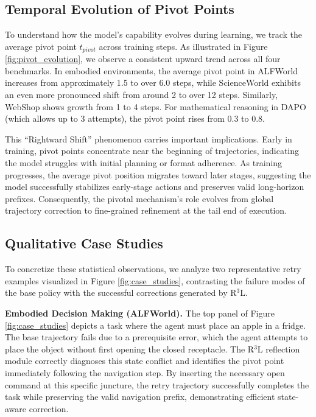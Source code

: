 \documentclass[11pt]{article}
\begin{document}
\subsection{Temporal Evolution of Pivot Points}

To understand how the model's capability evolves during learning, we track the average pivot point $t_{pivot}$ across training steps. As illustrated in Figure \ref{fig:pivot_evolution}, we observe a consistent upward trend across all four benchmarks. In embodied environments, the average pivot point in ALFWorld increases from approximately 1.5 to over 6.0 steps, while ScienceWorld exhibits an even more pronounced shift from around 2 to over 12 steps. Similarly, WebShop shows growth from 1 to 4 steps. For mathematical reasoning in DAPO (which allows up to 3 attempts), the pivot point rises from 0.3 to 0.8.

This ``Rightward Shift'' phenomenon carries important implications. Early in training, pivot points concentrate near the beginning of trajectories, indicating the model struggles with initial planning or format adherence. As training progresses, the average pivot position migrates toward later stages, suggesting the model successfully stabilizes early-stage actions and preserves valid long-horizon prefixes. Consequently, the pivotal mechanism's role evolves from global trajectory correction to fine-grained refinement at the tail end of execution.

\subsection{Qualitative Case Studies}
\label{sec:case_studies_vis}
To concretize these statistical observations, we analyze two representative retry examples visualized in Figure \ref{fig:case_studies}, contrasting the failure modes of the base policy with the successful corrections generated by R$^3$L.

\textbf{Embodied Decision Making (ALFWorld).} The top panel of Figure \ref{fig:case_studies} depicts a task where the agent must place an apple in a fridge. The base trajectory fails due to a prerequisite error, which the agent attempts to place the object without first opening the closed receptacle. The R$^3$L reflection module correctly diagnoses this state conflict and identifies the pivot point immediately following the navigation step. By inserting the necessary open command at this specific juncture, the retry trajectory successfully completes the task while preserving the valid navigation prefix, demonstrating efficient state-aware correction.
\end{document}
